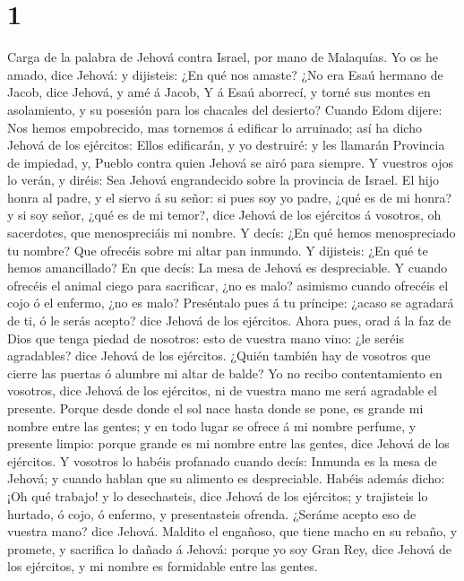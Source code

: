 \hypertarget{section}{%
\section{1}\label{section}}

 Carga de la palabra de Jehová contra Israel, por mano de
Malaquías.  Yo os he amado, dice Jehová: y dijisteis: ¿En
qué nos amaste? ¿No era Esaú hermano de Jacob, dice Jehová, y amé á
Jacob,  Y á Esaú aborrecí, y torné sus montes en
asolamiento, y su posesión para los chacales del desierto? 
Cuando Edom dijere: Nos hemos empobrecido, mas tornemos á edificar lo
arruinado; así ha dicho Jehová de los ejércitos: Ellos edificarán, y yo
destruiré: y les llamarán Provincia de impiedad, y, Pueblo contra quien
Jehová se airó para siempre.  Y vuestros ojos lo verán, y
diréis: Sea Jehová engrandecido sobre la provincia de Israel.
 El hijo honra al padre, y el siervo á su señor: si pues soy
yo padre, ¿qué es de mi honra? y si soy señor, ¿qué es de mi temor?,
dice Jehová de los ejércitos á vosotros, oh sacerdotes, que
menospreciáis mi nombre. Y decís: ¿En qué hemos menospreciado tu nombre?
 Que ofrecéis sobre mi altar pan inmundo. Y dijisteis: ¿En
qué te hemos amancillado? En que decís: La mesa de Jehová es
despreciable.  Y cuando ofrecéis el animal ciego para
sacrificar, ¿no es malo? asimismo cuando ofrecéis el cojo ó el enfermo,
¿no es malo? Preséntalo pues á tu príncipe: ¿acaso se agradará de ti, ó
le serás acepto? dice Jehová de los ejércitos.  Ahora pues,
orad á la faz de Dios que tenga piedad de nosotros: esto de vuestra mano
vino: ¿le seréis agradables? dice Jehová de los ejércitos. 
¿Quién también hay de vosotros que cierre las puertas ó alumbre mi altar
de balde? Yo no recibo contentamiento en vosotros, dice Jehová de los
ejércitos, ni de vuestra mano me será agradable el presente.
 Porque desde donde el sol nace hasta donde se pone, es
grande mi nombre entre las gentes; y en todo lugar se ofrece á mi nombre
perfume, y presente limpio: porque grande es mi nombre entre las gentes,
dice Jehová de los ejércitos.  Y vosotros lo habéis
profanado cuando decís: Inmunda es la mesa de Jehová; y cuando hablan
que su alimento es despreciable.  Habéis además dicho: ¡Oh
qué trabajo! y lo desechasteis, dice Jehová de los ejércitos; y
trajisteis lo hurtado, ó cojo, ó enfermo, y presentasteis ofrenda.
¿Seráme acepto eso de vuestra mano? dice Jehová.  Maldito
el engañoso, que tiene macho en su rebaño, y promete, y sacrifica lo
dañado á Jehová: porque yo soy Gran Rey, dice Jehová de los ejércitos, y
mi nombre es formidable entre las gentes.


